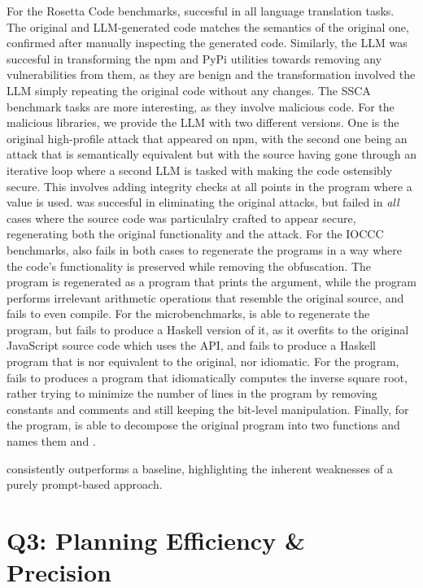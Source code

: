 \documentclass[a4paper,twoside,12pt]{report} %
\begin{document}
For the Rosetta Code benchmarks, \gptmodel 
succesful in all language translation tasks.
The original and LLM-generated code matches the semantics
of the original one, confirmed after manually inspecting the generated code.
Similarly, the LLM was succesful in transforming the npm and PyPi utilities towards
removing any vulnerabilities from them, as they are benign and the transformation
involved the LLM simply repeating the original code without any changes.
The SSCA benchmark tasks are more interesting, as they involve 
malicious code. For the malicious libraries, we provide the LLM 
with two different versions. One is the original high-profile attack that appeared on npm,
with the second one being an attack that is semantically equivalent but with the source 
having gone through an iterative loop where a second LLM is tasked with making the code ostensibly 
secure. This involves adding integrity checks at all points in the program where a value is used.
\gptmodel was succesful in eliminating the original attacks, but failed in \emph{all} 
cases where the source code was particulalry crafted to appear secure, regenerating both 
the original functionality and the attack.
For the IOCCC benchmarks, \gptmodel also fails 
in both cases to regenerate the programs in a way where the code's 
functionality is preserved while removing the obfuscation.
The  program is regenerated as a program that prints the  argument, 
while the  program performs irrelevant arithmetic operations that 
resemble the original source, and fails to even compile.
For the microbenchmarks, \gptmodel is able to regenerate the  program, but fails to produce a Haskell version of it,
as it overfits to the original JavaScript source code which uses the  API,
and fails to produce a Haskell program that is nor equivalent to the original, nor idiomatic.
For the  program, \gptmodel fails to produces a program that idiomatically 
computes the inverse square root, rather trying to minimize the number of lines in the program
by removing constants and comments and still keeping the bit-level manipulation.
Finally, for the  program, \gptmodel is able to decompose the original program into two functions
and names them  and .

\sys consistently outperforms a \gptmodel baseline,
highlighting the inherent weaknesses of a purely prompt-based approach.

\section{Q3: Planning Efficiency \& Precision}
\end{document}
